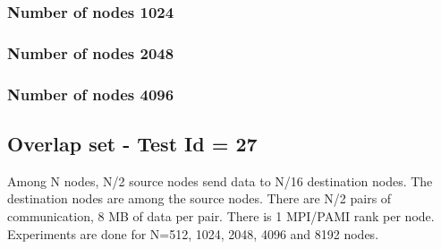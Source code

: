 \documentclass[letter]{article}
\begin{document}




\newpage

\subsubsection{Number of nodes 1024}





\newpage

\subsubsection{Number of nodes 2048}





\newpage

\subsubsection{Number of nodes 4096}





\newpage


%

%


\subsection{Overlap set - Test Id = 27}

Among N nodes, N/2 source nodes send data to N/16 destination nodes. The destination nodes are among the source nodes. There are N/2 pairs of communication, 8 MB of data per pair. There is 1 MPI/PAMI rank per node. Experiments are done for N=512, 1024, 2048, 4096 and 8192 nodes.
\end{document}
